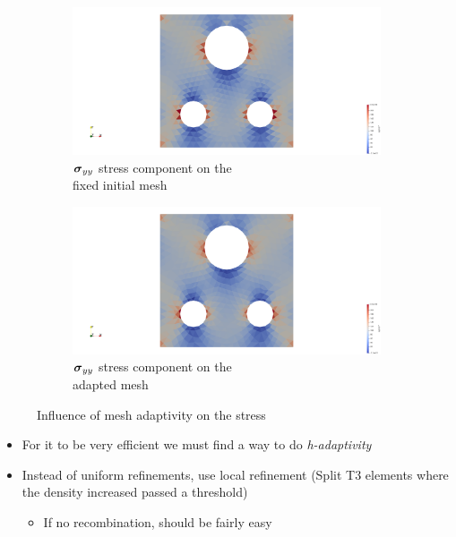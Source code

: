 \begin{figure}
	\begin{subfigure}[t]{0.5\linewidth}
		\centering
		\includegraphics[width=\linewidth]{Figures/Fixed_mesh_sigma_yy.png}
		\caption{$\mathcal{\boldsymbol{\sigma}}_{yy}$ stress component on the \\fixed initial mesh}
	\end{subfigure}
	\begin{subfigure}[t]{0.5\linewidth}
		\centering
		\includegraphics[width=\linewidth]{Figures/Free_mesh_sigma_yy.png}
		\caption{$\mathcal{\boldsymbol{\sigma}}_{yy}$ stress component on the \\adapted mesh}
	\end{subfigure}  
	\caption{Influence of mesh adaptivity on the stress}
	\label{fig:r-adaptivity}
\end{figure}


\begin{itemize}
	\item For it to be very efficient we must find a way to do \textit{h-adaptivity}
	\item Instead of uniform refinements, use local refinement (Split T3 elements where the density increased passed a threshold)
	\begin{itemize}
		\item If no recombination, should be fairly easy
	\end{itemize}
\end{itemize}

